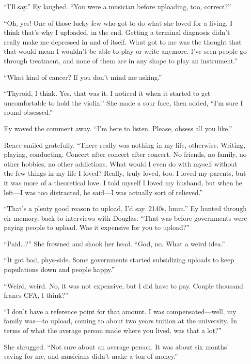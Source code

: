``I'll say.'' Ey laughed. ``You were a musician before uploading, too, correct?''

``Oh, yes! One of those lucky few who got to do what she loved for a living. I think that's why I uploaded, in the end. Getting a terminal diagnosis didn't really make me depressed in and of itself. What got to me was the thought that that would mean I wouldn't be able to play or write anymore. I've seen people go through treatment, and none of them are in any shape to play an instrument.''

``What kind of cancer? If you don't mind me asking.''

``Thyroid, I think. Yes, that was it. I noticed it when it started to get uncomfortable to hold the violin.'' She made a sour face, then added, ``I'm sure I sound obsessed.''

Ey waved the comment away. ``I'm here to listen. Please, obsess all you like.''

Renee smiled gratefully. ``There really was nothing in my life, otherwise. Writing, playing, conducting. Concert after concert after concert. No friends, no family, no other hobbies, no other addictions. What would I even do with myself without the few things in my life I loved? Really, truly loved, too. I loved my parents, but it was more of a theoretical love. I told myself I loved my husband, but when he left---I was too distracted, he said---I was actually sort of relieved.''\pagebreak

``That's a plenty good reason to upload, I'd say. 2140s, hmm.'' Ey hunted through eir memory, back to interviews with Douglas. ``That was before governments were paying people to upload. Was it expensive for you to upload?''

``Paid\ldots?'' She frowned and shook her head. ``God, no. What a weird idea.''

``It got bad, phys-side. Some governments started subsidizing uploads to keep populations down and people happy.''

``Weird, weird. No, it was not expensive, but I did have to pay. Couple thousand francs CFA, I think?''

``I don't have a reference point for that amount. I was compensated---well, my family was---to upload, coming to about two years tuition at the university. In terms of what the average person made where you lived, was that a lot?''

She shrugged. ``Not sure about an average person. It was about six months' saving for me, and musicians didn't make a ton of money.''

